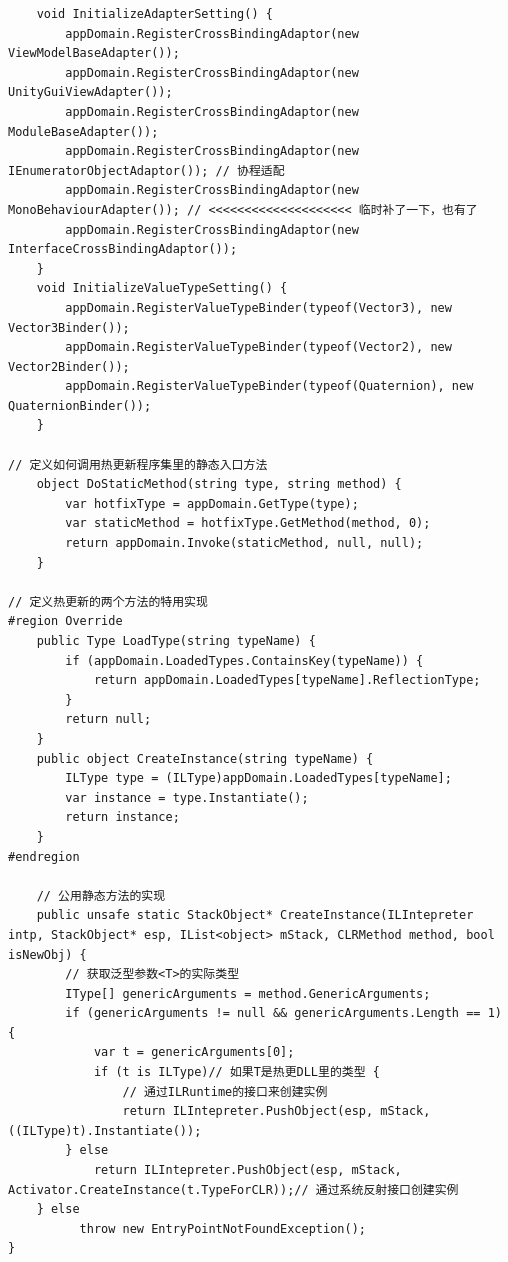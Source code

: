 \documentclass[9pt, b5paper]{article}
\begin{document}
\begin{verbatim}
    void InitializeAdapterSetting() {
        appDomain.RegisterCrossBindingAdaptor(new ViewModelBaseAdapter());  
        appDomain.RegisterCrossBindingAdaptor(new UnityGuiViewAdapter());   
        appDomain.RegisterCrossBindingAdaptor(new ModuleBaseAdapter());     
        appDomain.RegisterCrossBindingAdaptor(new IEnumeratorObjectAdaptor()); // 协程适配
        appDomain.RegisterCrossBindingAdaptor(new MonoBehaviourAdapter()); // <<<<<<<<<<<<<<<<<<<< 临时补了一下，也有了
        appDomain.RegisterCrossBindingAdaptor(new InterfaceCrossBindingAdaptor());
    }
    void InitializeValueTypeSetting() {
        appDomain.RegisterValueTypeBinder(typeof(Vector3), new Vector3Binder());
        appDomain.RegisterValueTypeBinder(typeof(Vector2), new Vector2Binder());
        appDomain.RegisterValueTypeBinder(typeof(Quaternion), new QuaternionBinder());
    }

// 定义如何调用热更新程序集里的静态入口方法
    object DoStaticMethod(string type, string method) {　
        var hotfixType = appDomain.GetType(type);
        var staticMethod = hotfixType.GetMethod(method, 0);
        return appDomain.Invoke(staticMethod, null, null);
    }

// 定义热更新的两个方法的特用实现    
#region Override
    public Type LoadType(string typeName) {
        if (appDomain.LoadedTypes.ContainsKey(typeName)) {
            return appDomain.LoadedTypes[typeName].ReflectionType;
        }
        return null;
    }
    public object CreateInstance(string typeName) {
        ILType type = (ILType)appDomain.LoadedTypes[typeName];
        var instance = type.Instantiate();
        return instance;
    }
#endregion

    // 公用静态方法的实现
    public unsafe static StackObject* CreateInstance(ILIntepreter intp, StackObject* esp, IList<object> mStack, CLRMethod method, bool isNewObj) {
        // 获取泛型参数<T>的实际类型
        IType[] genericArguments = method.GenericArguments;
        if (genericArguments != null && genericArguments.Length == 1) {
            var t = genericArguments[0];
            if (t is ILType)// 如果T是热更DLL里的类型 {
                // 通过ILRuntime的接口来创建实例
                return ILIntepreter.PushObject(esp, mStack, ((ILType)t).Instantiate());
        } else
            return ILIntepreter.PushObject(esp, mStack, Activator.CreateInstance(t.TypeForCLR));// 通过系统反射接口创建实例
    } else
          throw new EntryPointNotFoundException();
}


\end{verbatim}
\end{document}

